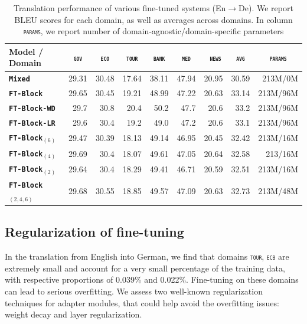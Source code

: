 \documentclass[11pt,a4paper]{article}
\newcommand{\fyTodo}[1]{\Todo[FY:]{\textcolor{orange}{#1}}}
\newcommand{\fyDone}[1]{\done[FY]\Todo[FY:]{\textcolor{orange}{#1}}}
\newcommand{\domain}[1]{\texttt{\textsc{#1}}}
\newcommand{\system}[1]{\texttt{\textbf{#1}}}
\begin{document}
\begin{table}[htbp]
  \centering
  \fyDone{Fix column size}
  \begin{tabular}{|p{3cm}|*{8}{r|}} \hline
    Model / Domain & \multicolumn{1}{c|}{\domain{gov}} & \multicolumn{1}{c|}{\domain{eco}} & \multicolumn{1}{c|}{\domain{tour}} & \multicolumn{1}{c|}{\domain{bank}} & \multicolumn{1}{c|}{\domain{ med }} & \multicolumn{1}{c|}{\domain{ news}} & \multicolumn{1}{c|}{\domain{avg}} & \multicolumn{1}{c|}{\domain{params}} \\ \hline
    \system{Mixed}  & 29.31 & 30.48 & 17.64 & 38.11 & 47.94 & 20.95  & 30.59 & 213M/0M\\
   \system{FT-Block}     & 29.65 & 30.45 & 19.21 & 48.99 & 47.22 & 20.63 & 33.14 & 213M/96M \\
   \system{FT-Block-WD}     & 29.7 & 30.8 & 20.4 & 50.2 & 47.7 & 20.6 & 33.2 & 213M/96M \\
   \system{FT-Block-LR}     & 29.6 & 30.4 & 19.2 & 49.0 & 47.2 & 20.6 & 33.1 & 213M/96M\\
   \system{FT-Block$_{(6)}$}     & 29.47 & 30.39 & 18.13 & 49.14 & 46.95 & 20.45 & 32.42 & 213M/16M \\
   \system{FT-Block$_{(4)}$}     & 29.69 & 30.4 & 18.07 & 49.61 & 47.05 & 20.64 & 32.58 & 213/16M\\
   \system{FT-Block$_{(2)}$}   & 29.64 & 30.4 & 18.29 & 49.41 & 46.71 & 20.59 & 32.51  & 213M/16M\\
   \system{FT-Block$_{(2,4,6)}$}  & 29.68  & 30.55 & 18.85 & 49.57 & 47.09 & 20.63 &  32.73 & 213M/48M \\
     \hline
  \end{tabular}
  \caption{Translation performance of various fine-tuned systems (En$\rightarrow$De). We report BLEU scores for each domain, as well as averages across domains. In column \domain{params}, we report number of domain-agnostic/domain-specific parameters}
  \label{tab:performance-en-de-pos-reg}
\end{table}

\fyTodo{Why HW worse than standard version ?} \fyTodo{Why is regularization not helping ? It helps for small domain - domain-specific regularization ??}

\subsection{Regularization of fine-tuning}
In the translation from English into German, we find that domains \domain{tour}, \domain{ecb} are extremely small and account for a very small percentage of the training data, with respective proportions of 0.039\% and 0.022\%. Fine-tuning on these domains can lead to serious overfitting. We assess two well-known regularization techniques for adapter modules, that could help avoid the overfitting issues: weight decay and layer regularization. 
\end{document}

